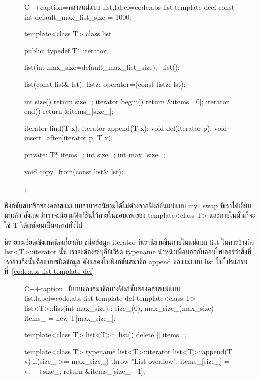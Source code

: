 \begin{figure}
\latintext
\begin{codelist}{C++}{caption={\thaitext ค{\wbr}ลา{\wbr}ส{\wbr}แม่แบบ {\ct list}\latintext},label=code:abs-list-template-decl}
const int default_max_list_size = 1000;

template<class T>
class list {
public:
  typedef T* iterator;

  list(int max_size=default_max_list_size);
  ~list();

  list(const list& lst);
  list& operator=(const list& lst);

  int size() { return size_; }
  iterator begin() { return &items_[0]; }
  iterator end() { return &items_[size_]; }

  iterator find(T x);
  iterator append(T x);
  void del(iterator p);
  void insert_after(iterator p, T x);

private:
  T* items_;
  int size_;
  int max_size_;

  void copy_from(const list& lst);
};
\end{codelist}
\thaitext
\end{figure}

ฟังก์ชัน{\wbr}สมาชิก{\wbr}ของ{\wbr}ค{\wbr}ลา{\wbr}ส{\wbr}แม่แบบ{\wbr}สามารถ{\wbr}นิยาม{\wbr}ได้{\wbr}ไม่{\wbr}ต่าง{\wbr}จาก{\wbr}ฟังก์ชัน{\wbr}แม่แบบ {\ct my\_swap}
ที่{\wbr}เรา{\wbr}ได้{\wbr}เขียน{\wbr}มา{\wbr}แล้ว สังเกต{\wbr}ว่า{\wbr}เรา{\wbr}จะ{\wbr}นิยาม{\wbr}ฟังก์ชัน{\wbr}ไว้{\wbr}ภายใน{\wbr}ขอบเขต{\wbr}ของ {\ct
  template<class T>} และ{\wbr}ภายใน{\wbr}นั้น{\wbr}ก็{\wbr}จะ{\wbr}ใช้ {\ct T} ได้{\wbr}เหมือน{\wbr}เป็น{\wbr}ค{\wbr}ลา{\wbr}ส{\wbr}ทั่วไป  

มี{\wbr}ราย{\wbr}ระ{\wbr}เอียด{\wbr}เชิง{\wbr}เทคนิค{\wbr}เกี่ยวกับ ชนิด{\wbr}ข้อมูล {\ct iterator} ที่{\wbr}เรา{\wbr}นิยาม{\wbr}ขึ้น{\wbr}ภายใน{\wbr}แม่แบบ{\wbr}
{\ct list} ใน{\wbr}การ{\wbr}อ้าง{\wbr}ถึง {\ct list<T>::iterator} นั้น เรา{\wbr}จะ{\wbr}ต้อง{\wbr}ระบุ{\wbr}คีย์{\wbr}เวิร์ด
{\ct typename} นำหน้า{\wbr}เพื่อ{\wbr}บอก{\wbr}กับ{\wbr}คอม{\wbr}ไพ{\wbr}เลอร์{\wbr}ว่า{\wbr}สิ่ง{\wbr}ที่{\wbr}เรา{\wbr}อ้าง{\wbr}ถึง{\wbr}นั้น{\wbr}คือ{\wbr}แบบ{\wbr}ชนิด{\wbr}ข้อมูล{\wbr}
ดัง{\wbr}แสดง{\wbr}ใน{\wbr}ฟังก์ชัน{\wbr}สมาชิก {\ct append} ของ{\wbr}แม่แบบ {\ct list}
ใน{\wbr}โปรแกรม{\wbr}ที่~\ref{code:abs-list-template-def}

\begin{figure}
\latintext
\begin{codelist}{C++}{caption={\thaitext นิยาม{\wbr}ของ{\wbr}สมาชิก{\wbr}บาง{\wbr}ฟังก์ชัน{\wbr}ของ{\wbr}ค{\wbr}ลา{\wbr}ส{\wbr}แม่แบบ {\ct list}\latintext},label=code:abs-list-template-def}
template<class T>
list<T>::list(int max_size)
  : size_(0), max_size_(max_size) 
{
  items_ = new T[max_size_];
}

template<class T>
list<T>::~list()
{
  delete [] items_;
}

template<class T>
typename list<T>::iterator list<T>::append(T v)
{
  if(size_ >= max_size_)
    throw "List overflow";
  items_[size_] = v;
  ++size_;
  return &items_[size_ - 1];
}
\end{codelist}
\thaitext
\end{figure}


